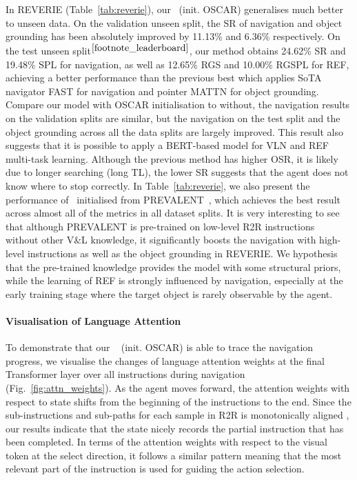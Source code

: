 \documentclass[final]{cvpr}
\begin{document}
In REVERIE \cite{qi2020reverie} (Table~\ref{tab:reverie}), our \vlnbert~(init. OSCAR) generalises much better to unseen data. On the validation unseen split, the SR of navigation and object grounding has been absolutely improved by 11.13\% and 6.36\% respectively. On the test unseen split$^{\ref{footnote_leaderboard}}$, our method obtains 24.62\% SR and 19.48\% SPL for navigation, as well as 12.65\% RGS and 10.00\% RGSPL for REF, achieving a better performance than the previous best \cite{qi2020reverie} which applies SoTA navigator FAST \cite{ke2019tactical} for navigation and pointer MATTN \cite{yu2018mattnet} for object grounding. Compare our model with OSCAR initialisation to without, the navigation results on the validation splits are similar, but the navigation on the test split and the object grounding across all the data splits are largely improved. This result also suggests that it is possible to apply a BERT-based model for VLN and REF multi-task learning. Although the previous method has higher OSR, it is likely due to longer searching (long TL), the lower SR suggests that the agent does not know where to stop correctly. In Table~\ref{tab:reverie}, we also present the performance of \vlnbert~initialised from PREVALENT~\cite{hao2020towards}, which achieves the best result across almost all of the metrics in all dataset splits. It is very interesting to see that although PREVALENT is pre-trained on low-level R2R instructions~\cite{anderson2018vision} without other V\&L knowledge, it significantly boosts the navigation with high-level instructions as well as the object grounding in REVERIE. We hypothesis that the pre-trained knowledge provides the model with some structural priors, while the learning of REF is strongly influenced by navigation, especially at the early training stage where the target object is rarely observable by the agent.


\paragraph{Visualisation of Language Attention}
To demonstrate that our \vlnbert~ (init. OSCAR) is able to trace the navigation progress, we visualise the changes of language attention weights at the final Transformer layer over all instructions during navigation (Fig.~\ref{fig:attn_weights}). As the agent moves forward, the attention weights with respect to state shifts from the beginning of the instructions to the end. Since the sub-instructions and sub-paths for each sample in R2R is monotonically aligned \cite{hong-etal-2020-sub}, our results indicate that the state nicely records the partial instruction that has been completed. In terms of the attention weights with respect to the visual token at the select direction, it follows a similar pattern meaning that the most relevant part of the instruction is used for guiding the action selection.
\end{document}
